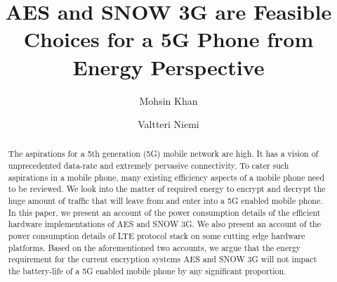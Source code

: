 \documentclass[lnicst,sechang,a4paper]{svmultln}
\begin{document}
\mainmatter  %

\title{AES and SNOW 3G are Feasible Choices for a 5G Phone from Energy Perspective}


%
%
\author{Mohsin Khan%
\and Valtteri Niemi}  %


%
%

\maketitle


\begin{abstract}
The aspirations for a 5th generation (5G) mobile network are high. It has a vision of unprecedented data-rate and extremely pervasive connectivity. To cater such aspirations in a mobile phone, many existing efficiency aspects of a mobile phone need to be reviewed. We look into the matter of required energy to encrypt and decrypt the huge amount of traffic that will leave from and enter into a 5G enabled mobile phone. In this paper, we present an account of the power consumption details of the efficient hardware implementations of AES and SNOW 3G. We also present an account of the power consumption details of LTE protocol stack on some cutting edge hardware platforms. Based on the aforementioned two accounts, we argue that the energy requirement for the current encryption systems AES and SNOW 3G will not impact the battery-life of a 5G enabled mobile phone by any significant proportion.
\end{abstract}
\end{document}

